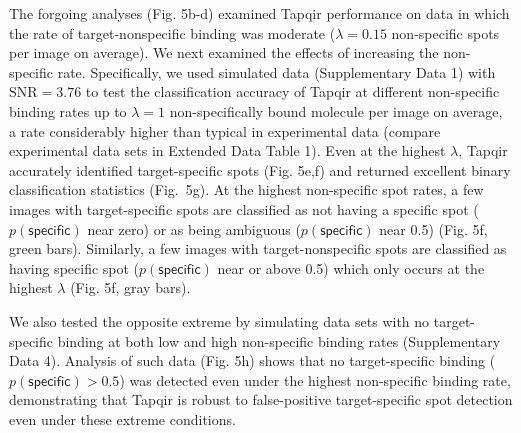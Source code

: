 
The forgoing analyses (Fig. 5b-d) examined Tapqir performance on data in which the rate of target-nonspecific binding was moderate ($\lambda  = 0.15$ non-specific spots per image on average).  We next examined the effects of increasing the non-specific rate.  Specifically, we used  simulated data (Supplementary Data 1) with $\textrm{SNR} = 3.76$ to test the classification accuracy of Tapqir at different non-specific binding rates up to $\lambda  = 1$ non-specifically bound molecule per image on average, a rate considerably higher than typical in experimental data (compare experimental data sets in Extended Data Table 1).  Even at the highest $\lambda$,  Tapqir accurately identified target-specific spots (Fig. 5e,f) and returned excellent binary classification statistics (Fig.~5g).  At the highest non-specific spot rates, a few images with target-specific spots are classified as not having a specific spot ($p(\mathsf{specific})$ near zero) or as being ambiguous ($p(\mathsf{specific})$ near 0.5) (Fig. 5f, green bars). Similarly, a few images with target-nonspecific spots are classified as having specific spot ($p(\mathsf{specific})$ near or above 0.5) which only occurs at the highest $\lambda$ (Fig. 5f, gray bars).

We also tested the opposite extreme by simulating data sets with no target-specific binding at both low and high non-specific binding rates (Supplementary Data 4). Analysis of such data  (Fig. 5h) shows that no target-specific binding ($p(\mathsf{specific}) > 0.5$) was detected even under the highest non-specific binding rate, demonstrating that Tapqir is robust to false-positive target-specific spot detection even under these extreme conditions. 

